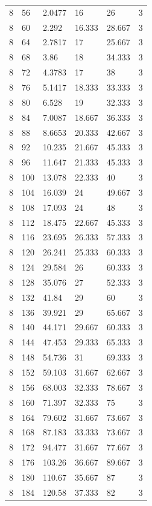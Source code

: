 \begin{tabular}{|p{0.6cm}|p{0.5cm}|p{1.15cm}|p{1cm}|p{1cm}|p{0.7cm}|}
8 & 56 & 2.0477 & 16 & 26 & 3 \\
8 & 60 & 2.292 & 16.333 & 28.667 & 3 \\
8 & 64 & 2.7817 & 17 & 25.667 & 3 \\
8 & 68 & 3.86 & 18 & 34.333 & 3 \\
8 & 72 & 4.3783 & 17 & 38 & 3 \\
8 & 76 & 5.1417 & 18.333 & 33.333 & 3 \\
8 & 80 & 6.528 & 19 & 32.333 & 3 \\
8 & 84 & 7.0087 & 18.667 & 36.333 & 3 \\
8 & 88 & 8.6653 & 20.333 & 42.667 & 3 \\
8 & 92 & 10.235 & 21.667 & 45.333 & 3 \\
8 & 96 & 11.647 & 21.333 & 45.333 & 3 \\
8 & 100 & 13.078 & 22.333 & 40 & 3 \\
8 & 104 & 16.039 & 24 & 49.667 & 3 \\
8 & 108 & 17.093 & 24 & 48 & 3 \\
8 & 112 & 18.475 & 22.667 & 45.333 & 3 \\
8 & 116 & 23.695 & 26.333 & 57.333 & 3 \\
8 & 120 & 26.241 & 25.333 & 60.333 & 3 \\
8 & 124 & 29.584 & 26 & 60.333 & 3 \\
8 & 128 & 35.076 & 27 & 52.333 & 3 \\
8 & 132 & 41.84 & 29 & 60 & 3 \\
8 & 136 & 39.921 & 29 & 65.667 & 3 \\
8 & 140 & 44.171 & 29.667 & 60.333 & 3 \\
8 & 144 & 47.453 & 29.333 & 65.333 & 3 \\
8 & 148 & 54.736 & 31 & 69.333 & 3 \\
8 & 152 & 59.103 & 31.667 & 62.667 & 3 \\
8 & 156 & 68.003 & 32.333 & 78.667 & 3 \\
8 & 160 & 71.397 & 32.333 & 75 & 3 \\
8 & 164 & 79.602 & 31.667 & 73.667 & 3 \\
8 & 168 & 87.183 & 33.333 & 73.667 & 3 \\
8 & 172 & 94.477 & 31.667 & 77.667 & 3 \\
8 & 176 & 103.26 & 36.667 & 89.667 & 3 \\
8 & 180 & 110.67 & 35.667 & 87 & 3 \\
8 & 184 & 120.58 & 37.333 & 82 & 3 \\

\end{tabular}

